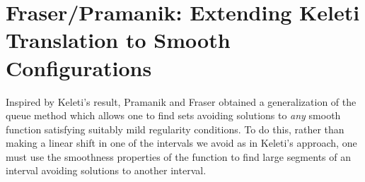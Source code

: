 






\section{Fraser/Pramanik: Extending Keleti Translation to Smooth Configurations}

Inspired by Keleti's result, Pramanik and Fraser obtained a generalization of the queue method which allows one to find sets avoiding solutions to {\it any} smooth function satisfying suitably mild regularity conditions. To do this, rather than making a linear shift in one of the intervals we avoid as in Keleti's approach, one must use the smoothness properties of the function to find large segments of an interval avoiding solutions to another interval.

